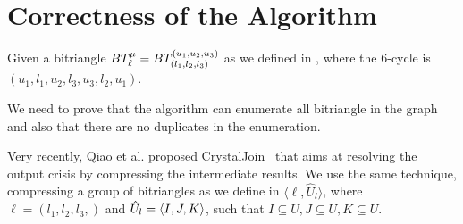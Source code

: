       
\clearpage
\section{Correctness of the Algorithm}
Given a bitriangle  $BT_{\ell}^{\mu} = BT_{(l_1, l_2,l_3)}^{(u_1, u_2, u_3)}$ as we defined in , where the 6-cycle is $(u_1,l_1,u_2,l_3,u_3,l_2,u_1)$.


We need to prove that the algorithm can enumerate all bitriangle in the graph and also that there are no duplicates in the enumeration.

Very recently, Qiao et al. proposed CrystalJoin~\cite{Lai} that aims at resolving the output crisis by compressing the intermediate results.
We use the same technique, compressing a group of bitriangles as we define in  $\langle \ell, \hat{U}_l\rangle$, where $\ell = (l_1,l_2,l_3,)$ and $\hat{U}_l= \left\langle I, J, K\right\rangle$, such that $I \subseteq U, J \subseteq U, K \subseteq U$.
 

